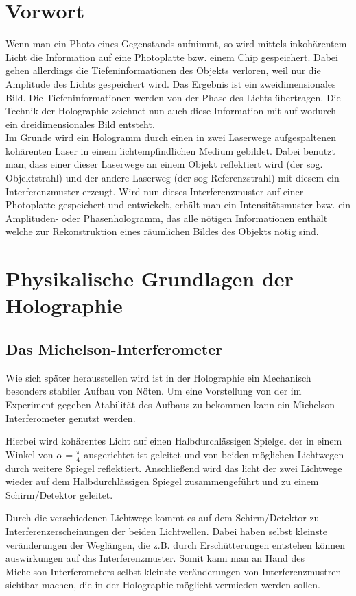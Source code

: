 \section{Vorwort}
Wenn man ein Photo eines Gegenstands aufnimmt, so wird mittels inkohärentem Licht die Information auf eine Photoplatte bzw. einem Chip gespeichert. Dabei gehen allerdings die Tiefeninformationen des Objekts verloren, weil nur die Amplitude des Lichts gespeichert wird. Das Ergebnis ist ein zweidimensionales Bild. Die Tiefeninformationen werden von der Phase des Lichts übertragen. Die Technik der Holographie zeichnet nun auch diese Information mit auf wodurch ein dreidimensionales Bild entsteht.\\

Im Grunde wird ein Hologramm durch einen in zwei Laserwege aufgespaltenen kohärenten Laser in einem lichtempfindlichen Medium gebildet. Dabei benutzt man, dass einer dieser Laserwege an einem Objekt reflektiert wird (der sog. Objektstrahl) und der andere Laserweg (der sog Referenzstrahl) mit diesem ein Interferenzmuster erzeugt.
Wird nun dieses Interferenzmuster auf einer Photoplatte gespeichert und entwickelt, erhält man ein Intensitätsmuster bzw. ein Amplituden- oder Phasenhologramm, das alle nötigen Informationen enthält welche zur Rekonstruktion eines räumlichen Bildes des Objekts nötig sind.

\section{Physikalische Grundlagen der Holographie}

\subsection{Das Michelson-Interferometer}
Wie sich später herausstellen wird ist in der Holographie ein Mechanisch besonders stabiler Aufbau von Nöten. Um eine Vorstellung von der im Experiment gegeben Atabilität des Aufbaus zu bekommen kann ein Michelson-Interferometer genutzt werden. 

Hierbei wird kohärentes Licht auf einen Halbdurchlässigen Spielgel der in einem Winkel von $\alpha = \frac{\pi}{4}$ ausgerichtet ist geleitet und von beiden möglichen Lichtwegen durch weitere Spiegel reflektiert. Anschließend wird das licht der zwei Lichtwege wieder auf dem Halbdurchlässigen Spiegel zusammengeführt und zu einem Schirm/Detektor geleitet.

Durch die verschiedenen Lichtwege kommt es auf dem Schirm/Detektor zu Interferenzerscheinungen der beiden Lichtwellen. Dabei haben selbst kleinste veränderungen der Weglängen, die z.B. durch Erschütterungen entstehen können auswirkungen auf das Interferenzmuster. Somit kann man an Hand des Michelson-Interferometers selbst kleinste veränderungen von Interferenzmustren sichtbar machen, die in der Holographie möglicht vermieden werden sollen.


